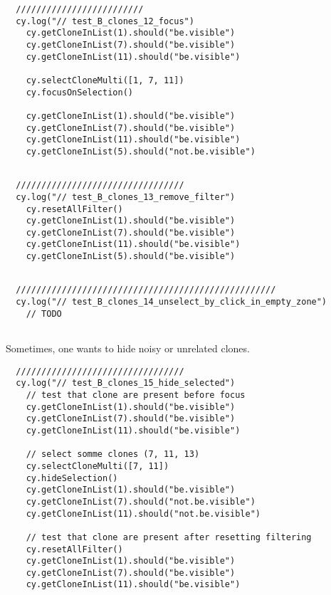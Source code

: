 \begin{verbatim}
  /////////////////////////
  cy.log("// test_B_clones_12_focus")
    cy.getCloneInList(1).should("be.visible")
    cy.getCloneInList(7).should("be.visible")
    cy.getCloneInList(11).should("be.visible")

    cy.selectCloneMulti([1, 7, 11])
    cy.focusOnSelection()

    cy.getCloneInList(1).should("be.visible")
    cy.getCloneInList(7).should("be.visible")
    cy.getCloneInList(11).should("be.visible")
    cy.getCloneInList(5).should("not.be.visible")


\end{verbatim}

\begin{verbatim}
  /////////////////////////////////
  cy.log("// test_B_clones_13_remove_filter")
    cy.resetAllFilter()
    cy.getCloneInList(1).should("be.visible")
    cy.getCloneInList(7).should("be.visible")
    cy.getCloneInList(11).should("be.visible")
    cy.getCloneInList(5).should("be.visible")


\end{verbatim}

\begin{verbatim}
  ///////////////////////////////////////////////////
  cy.log("// test_B_clones_14_unselect_by_click_in_empty_zone")
    // TODO


\end{verbatim}

Sometimes, one wants to hide noisy or unrelated clones.

\begin{verbatim}
  /////////////////////////////////
  cy.log("// test_B_clones_15_hide_selected")
    // test that clone are present before focus
    cy.getCloneInList(1).should("be.visible")
    cy.getCloneInList(7).should("be.visible")
    cy.getCloneInList(11).should("be.visible")

    // select somme clones (7, 11, 13)
    cy.selectCloneMulti([7, 11])
    cy.hideSelection()
    cy.getCloneInList(1).should("be.visible")
    cy.getCloneInList(7).should("not.be.visible")
    cy.getCloneInList(11).should("not.be.visible")
    
    // test that clone are present after resetting filtering
    cy.resetAllFilter()
    cy.getCloneInList(1).should("be.visible")
    cy.getCloneInList(7).should("be.visible")
    cy.getCloneInList(11).should("be.visible")


\end{verbatim}


